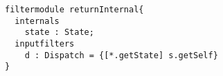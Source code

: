 \begin{lstlisting}[caption = {How to get hold of an internal}, label = lst::ARM:fmp:commentdotnet1,
style = listing, language=ComposeStar, float = tpb]
filtermodule returnInternal{
  internals
    state : State;
  inputfilters
    d : Dispatch = {[*.getState] s.getSelf}
}
\end{lstlisting}